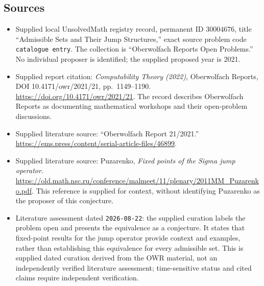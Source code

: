 \documentclass[11pt]{article}
\begin{document}
\subsection{Sources}
\begin{itemize}
\item Supplied local UnsolvedMath registry record, permanent ID \(30004676\), title ``Admissible Sets and Their Jump Structures,'' exact source problem code \texttt{catalogue entry}. The collection is ``Oberwolfach Reports Open Problems.'' No individual proposer is identified; the supplied proposed year is 2021.
\item Supplied report citation: \emph{Computability Theory (2022)}, Oberwolfach Reports, DOI 10.4171/owr/2021/21, pp.\ 1149--1190. \url{https://doi.org/10.4171/owr/2021/21}. The record describes Oberwolfach Reports as documenting mathematical workshops and their open-problem discussions.
\item Supplied literature source: ``Oberwolfach Report 21/2021.'' \url{https://ems.press/content/serial-article-files/46899}.
\item Supplied literature source: Puzarenko, \emph{Fixed points of the Sigma jump operator}. \url{https://old.math.nsc.ru/conference/malmeet/11/plenary/2011MM_Puzarenko.pdf}. This reference is supplied for context, without identifying Puzarenko as the proposer of this conjecture.
\item Literature assessment dated \texttt{2026-08-22}: the supplied curation labels the problem open and presents the equivalence as a conjecture. It states that fixed-point results for the jump operator provide context and examples, rather than establishing this equivalence for every admissible set. This is supplied dated curation derived from the OWR material, not an independently verified literature assessment; time-sensitive status and cited claims require independent verification.
\end{itemize}
\end{document}
